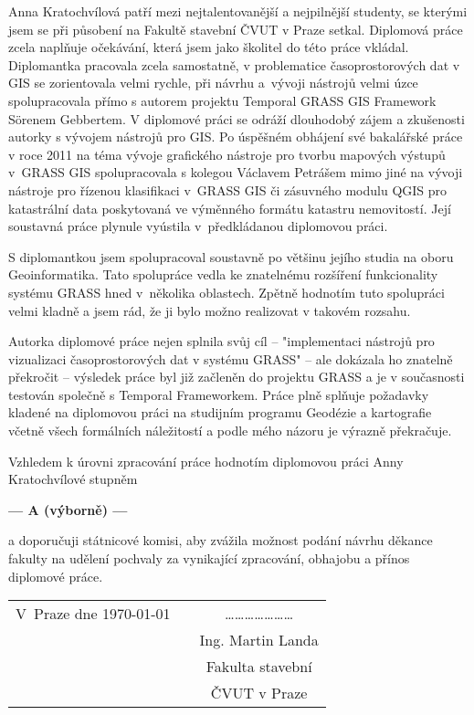 \documentclass[czech,11pt,a4paper]{article}
\begin{document}
Anna Kratochvílová patří mezi nejtalentovanější a nejpilnější
studenty, se kterými jsem se při působení na Fakultě stavební ČVUT v
Praze setkal. Diplomová práce zcela naplňuje očekávání, která jsem
jako školitel do této práce vkládal. Diplomantka pracovala zcela
samostatně, v problematice časoprostorových dat v GIS se zorientovala
velmi rychle, při návrhu a~vývoji nástrojů velmi úzce spolupracovala
přímo s autorem projektu Temporal GRASS GIS Framework S\"orenem
Gebbertem. V diplomové práci se odráží dlouhodobý zájem a zkušenosti
autorky s vývojem nástrojů pro GIS. Po úspěšném obhájení své
bakalářské práce v roce 2011 na téma vývoje grafického nástroje pro
tvorbu mapových výstupů v~GRASS GIS spolupracovala s kolegou Václavem
Petrášem mimo jiné na vývoji nástroje pro řízenou klasifikaci v~GRASS
GIS či zásuvného modulu QGIS pro katastrální data poskytovaná ve
výměnného formátu katastru nemovitostí. Její soustavná práce plynule
vyústila v~předkládanou diplomovou práci.

S diplomantkou jsem spolupracoval soustavně po většinu jejího studia
na oboru Geoinformatika. Tato spolupráce vedla ke znatelnému rozšíření
funkcionality systému GRASS hned v~několika oblastech. Zpětně hodnotím
tuto spolupráci velmi kladně a jsem rád, že ji bylo možno realizovat v
takovém rozsahu. \newpage

Autorka diplomové práce nejen splnila svůj cíl -- "implementaci
nástrojů pro vizualizaci časoprostorových dat v systému GRASS" -- ale
dokázala ho znatelně překročit -- výsledek práce byl již začleněn do
projektu GRASS a je v současnosti testován společně s Temporal
Frameworkem. Práce plně splňuje požadavky kladené na diplomovou práci
na studijním programu Geodézie a kartografie včetně všech formálních
náležitostí a podle mého názoru je výrazně překračuje.

Vzhledem k úrovni zpracování práce hodnotím diplomovou práci Anny
Kratochvílové stupněm

\begin{center}
{\bf --- A (výborně)  ---}
\end{center}

a doporučuji státnicové komisi, aby zvážila možnost podání návrhu
děkance fakulty na udělení pochvaly za vynikající zpracování, obhajobu
a přínos diplomové práce.

\vspace{2cm}

\begin{tabular}{lp{}c}
V~Praze dne \today & & \ldots\ldots\ldots\ldots\ldots\ldots\ldots \\
& & Ing. Martin Landa \\
& & Fakulta stavební \\
& & ČVUT v Praze \\
\end{tabular}
\end{document}
